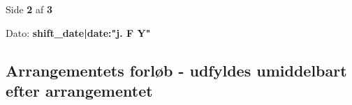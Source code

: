 \documentclass[a4paper, 11pt]{article}
\begin{document}
{{{{{\vfill

\begin{center}
    Side \textbf{2} af \textbf{3}
\end{center}

\newpage

{%

\noindent
\small{Dato: \textbf{ {{ shift_date|date:"j. F Y" }} } }

\subsection*{Arrangementets forløb - udfyldes umiddelbart efter arrangementet}

}}}}}}
\end{document}
